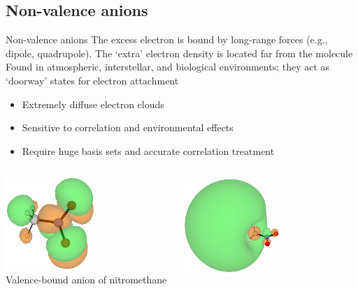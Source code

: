 \documentclass[9pt,t,xcolor=table]{beamer}
\begin{document}
\subsection{Non-valence anions}
\begin{frame}{\huge Non-valence anions}\large
    \vspace{5pt}
	The excess electron is bound by long-range forces (e.g., dipole, quadrupole). The `extra' electron density is located far from the molecule\\
	Found in atmospheric, interstellar, and biological environments; they act as `doorway' states for electron attachment
    \begin{itemize} 

            \item Extremely diffuse electron clouds
            \item Sensitive to correlation and environmental effects
            \item Require huge basis sets and accurate correlation treatment
    \end{itemize}
    \vspace{5pt}
	\begin{columns}
		\begin{column}{0.27\textwidth}
			\centering
			\includegraphics[width=0.55\textwidth]{Figs/MeNO2_VBS.png}\\
			\vspace{3pt}
			\small Valence-bound anion of nitromethane
		\end{column}
		\begin{column}{0.3\textwidth}
			\centering
			\includegraphics[width=0.55\textwidth]{Figs/MeNO2_DBS.png}\\

\end{column}
\end{columns}
\end{frame}
\end{document}
